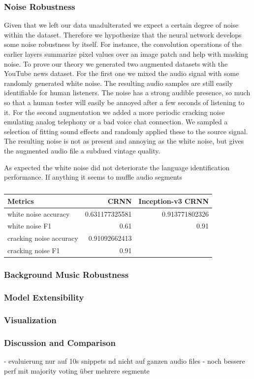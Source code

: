 \subsubsection{Noise Robustness} 
\label{sec:noise_robustness}
Given that we left our data unadulterated we expect a certain degree of noise within the dataset. Therefore we hypothesize that the neural network develops some noise robustness by itself. For instance, the convolution operations of the earlier layers summarize pixel values over an image patch and help with masking noise. To prove our theory we generated two augmented datasets with the YouTube news dataset. 
For the first one we mixed the audio signal with some randomly generated white noise. The resulting audio samples are still easily identifiable for human listeners. The noise has a strong audible presence, so much so that a human tester will easily be annoyed after a few seconds of listening to it.
For the second augmentation we added a more periodic cracking noise emulating analog telephony or a bad voice chat connection. We sampled a selection of fitting sound effects and randomly applied these to the source signal. The resulting noise is not as present and annoying as the white noise, but gives the augmented audio file a subdued vintage quality.

As expected the white noise did not deteriorate the language identification performance. If anything it seems to muffle audio segments 
 
	\begin{table}[]
	\centering
	\begin{tabularx}{\textwidth}{lrr}
	\toprule
	Metrics					& CRNN 		& Inception-v3 CRNN 	\\ \midrule
	white noise accuracy    	& 0.631177325581			& 0.913771802326 	\\
	white noise F1			& 0.61			& 0.91 	\\
	cracking noise accuracy	& 0.91092662413			&  	\\
	cracking noise F1 		& 0.91				&  	\\
 	\bottomrule
	\end{tabularx}
	\caption{}
	\label{tab:audio_duration}
	\end{table}


\subsubsection{Background Music Robustness} 
\label{sec:music_robustness}


\subsubsection{Model Extensibility} 
\label{sec:extensibility}
\subsubsection{Visualization} 
\label{sec:visualization}

\subsubsection{Discussion and Comparison} 
\label{sec:comparison}

- evaluierung nur auf 10s snippets nd nicht auf ganzen audio files
- noch bessere perf mit majority voting über mehrere segmente
